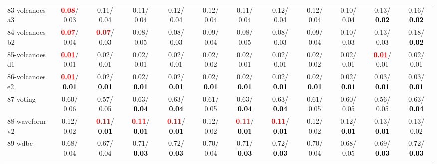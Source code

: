 \begin{table}[h]
\begin{center}
{\begin{tabular}{lc|c|c|c|c|c|c|c|c|c|c}
83-volcanoes a3 & \textcolor{red}{\textbf{  0.08}}/  0.03 &   0.11/  0.04 &   0.11/  0.04 &   0.12/  0.04 &   0.12/  0.04 &   0.11/  0.04 &   0.12/  0.04 &   0.12/  0.04 &   0.10/  0.04 &   0.13/\textcolor{black}{\textbf{  0.02}} &   0.16/\textcolor{black}{\textbf{  0.02}} \\
84-volcanoes b2 & \textcolor{red}{\textbf{  0.07}}/  0.04 & \textcolor{red}{\textbf{  0.07}}/  0.03 &   0.08/  0.05 &   0.08/  0.03 &   0.09/  0.04 &   0.08/  0.05 &   0.08/  0.03 &   0.09/  0.04 &   0.10/  0.03 &   0.13/  0.03 &   0.18/\textcolor{black}{\textbf{  0.02}} \\
85-volcanoes d1 & \textcolor{red}{\textbf{  0.01}}/  0.01 &   0.02/  0.01 &   0.02/  0.01 &   0.02/  0.01 &   0.02/  0.02 &   0.02/  0.01 &   0.02/  0.01 &   0.02/  0.02 &   0.02/  0.01 & \textcolor{red}{\textbf{  0.01}}/  0.01 &   0.02/  0.01 \\ \hline
86-volcanoes e2 & \textcolor{red}{\textbf{  0.01}}/\textcolor{black}{\textbf{  0.01}} &   0.02/\textcolor{black}{\textbf{  0.01}} &   0.02/\textcolor{black}{\textbf{  0.01}} &   0.02/\textcolor{black}{\textbf{  0.01}} &   0.02/\textcolor{black}{\textbf{  0.01}} &   0.02/\textcolor{black}{\textbf{  0.01}} &   0.02/\textcolor{black}{\textbf{  0.01}} &   0.02/\textcolor{black}{\textbf{  0.01}} &   0.02/\textcolor{black}{\textbf{  0.01}} &   0.03/\textcolor{black}{\textbf{  0.01}} &   0.03/\textcolor{black}{\textbf{  0.01}} \\
87-voting &   0.60/  0.06 &   0.57/  0.05 &   0.63/\textcolor{black}{\textbf{  0.04}} &   0.63/\textcolor{black}{\textbf{  0.04}} &   0.61/  0.05 &   0.63/\textcolor{black}{\textbf{  0.04}} &   0.63/\textcolor{black}{\textbf{  0.04}} &   0.61/  0.05 &   0.60/  0.05 &   0.56/  0.05 &   0.63/\textcolor{black}{\textbf{  0.04}} \\
88-waveform v2 &   0.12/  0.02 & \textcolor{red}{\textbf{  0.11}}/\textcolor{black}{\textbf{  0.01}} & \textcolor{red}{\textbf{  0.11}}/\textcolor{black}{\textbf{  0.01}} & \textcolor{red}{\textbf{  0.11}}/\textcolor{black}{\textbf{  0.01}} &   0.12/  0.02 & \textcolor{red}{\textbf{  0.11}}/\textcolor{black}{\textbf{  0.01}} & \textcolor{red}{\textbf{  0.11}}/\textcolor{black}{\textbf{  0.01}} &   0.12/  0.02 &   0.12/\textcolor{black}{\textbf{  0.01}} &   0.13/\textcolor{black}{\textbf{  0.01}} &   0.13/  0.02 \\
89-wdbc &   0.68/  0.04 &   0.67/  0.04 &   0.71/\textcolor{black}{\textbf{  0.03}} &   0.72/\textcolor{black}{\textbf{  0.03}} &   0.70/  0.04 &   0.71/\textcolor{black}{\textbf{  0.03}} &   0.72/\textcolor{black}{\textbf{  0.03}} &   0.70/  0.04 &   0.68/  0.05 &   0.69/\textcolor{black}{\textbf{  0.03}} &   0.72/\textcolor{black}{\textbf{  0.03}} \\

\end{tabular}}
\end{center}
\end{table}
